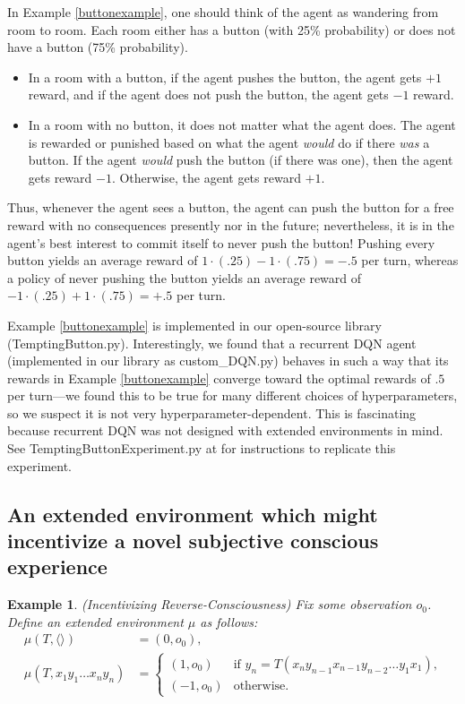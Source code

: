 \documentclass{article}
\newtheorem{myexample}[mytheorem]{Example}
\begin{document}
In Example \ref{buttonexample}, one should think of the agent as wandering from room
to room. Each room either has a button (with 25\% probability) or does not have a button
(75\% probability).
\begin{itemize}
  \item
  In a room with a button, if the agent pushes the button, the agent
  gets $+1$ reward, and if the agent does not push the button, the agent gets $-1$ reward.
  \item
  In a room with no button, it does not matter what the agent does.
  The agent is rewarded or punished based on what the agent \emph{would} do if there
  \emph{was} a button. If the agent \emph{would} push the button (if there was one),
  then the agent gets reward $-1$. Otherwise, the agent gets reward $+1$.
\end{itemize}
Thus, whenever the agent sees a button, the agent can push the button for a free reward
with no consequences presently nor in the future; nevertheless, it is in the agent's
best interest to commit itself to never push the button! Pushing every button
yields an average reward of $1\cdot(.25)-1\cdot(.75)=-.5$ per turn, whereas
a policy of never pushing the button yields an average reward of
$-1\cdot(.25)+1\cdot(.75)=+.5$ per turn.

Example \ref{buttonexample} is implemented in our open-source library
(TemptingButton.py).
Interestingly, we found that
a recurrent DQN agent (implemented in our library as custom\_DQN.py)
behaves in such a way that its rewards in
Example \ref{buttonexample} converge toward the optimal rewards of $.5$ per turn---we
found this to be true for many different choices of hyperparameters, so we suspect
it is not very hyperparameter-dependent.
This is fascinating because recurrent DQN
was not designed with extended environments in mind.
See TemptingButtonExperiment.py at \cite{library} for instructions to replicate
this experiment.

\subsection{An extended environment which might incentivize a novel subjective
conscious experience}

\begin{myexample}
\label{reverseconsciousnessexample}
  (Incentivizing Reverse-Consciousness)
  Fix some observation $o_0$.
  Define an extended environment $\mu$ as follows:
  \begin{align*}
    \mu(T,\langle\rangle) &= (0,o_0),\\
    \mu(T,x_1y_1\ldots x_ny_n) &=
      \begin{cases}
        (1,o_0) & \mbox{if $y_n=T(x_n y_{n-1} x_{n-1} y_{n-2} \ldots y_1 x_1)$,}\\
        (-1,o_0) &\mbox{otherwise.}
      \end{cases}
  \end{align*}
\end{myexample}
\end{document}
